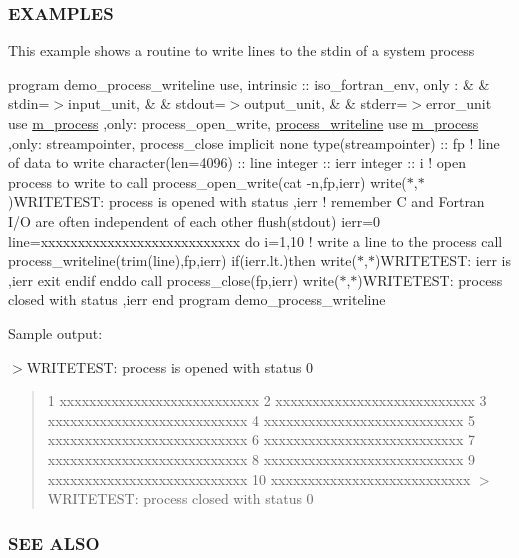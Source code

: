 \subsubsection*{E\+X\+A\+M\+P\+L\+ES}

This example shows a routine to write lines to the stdin of a system process

program demo\+\_\+process\+\_\+writeline use, intrinsic \+:\+: iso\+\_\+fortran\+\_\+env, only \+: \& \& stdin=$>$input\+\_\+unit, \& \& stdout=$>$output\+\_\+unit, \& \& stderr=$>$error\+\_\+unit use \mbox{\hyperlink{namespacem__process}{m\+\_\+process}} ,only\+: process\+\_\+open\+\_\+write, \mbox{\hyperlink{interfacem__process_1_1process__writeline}{process\+\_\+writeline}} use \mbox{\hyperlink{namespacem__process}{m\+\_\+process}} ,only\+: streampointer, process\+\_\+close implicit none type(streampointer) \+:\+: fp ! line of data to write character(len=4096) \+:\+: line integer \+:\+: ierr integer \+:\+: i ! open process to write to call process\+\_\+open\+\_\+write(\textquotesingle{}cat -\/n\textquotesingle{},fp,ierr) write($\ast$,$\ast$)\textquotesingle{}W\+R\+I\+T\+E\+T\+E\+ST\+: process is opened with status \textquotesingle{},ierr ! remember C and Fortran I/O are often independent of each other flush(stdout) ierr=0 line=\textquotesingle{}xxxxxxxxxxxxxxxxxxxxxxxxxxx\textquotesingle{} do i=1,10 ! write a line to the process call process\+\_\+writeline(trim(line),fp,ierr) if(ierr.\+lt.)then write($\ast$,$\ast$)\textquotesingle{}W\+R\+I\+T\+E\+T\+E\+ST\+: ierr is \textquotesingle{},ierr exit endif enddo call process\+\_\+close(fp,ierr) write($\ast$,$\ast$)\textquotesingle{}W\+R\+I\+T\+E\+T\+E\+ST\+: process closed with status \textquotesingle{},ierr end program demo\+\_\+process\+\_\+writeline

Sample output\+:

$>$W\+R\+I\+T\+E\+T\+E\+ST\+: process is opened with status 0 \begin{quote}
1 xxxxxxxxxxxxxxxxxxxxxxxxxxx 2 xxxxxxxxxxxxxxxxxxxxxxxxxxx 3 xxxxxxxxxxxxxxxxxxxxxxxxxxx 4 xxxxxxxxxxxxxxxxxxxxxxxxxxx 5 xxxxxxxxxxxxxxxxxxxxxxxxxxx 6 xxxxxxxxxxxxxxxxxxxxxxxxxxx 7 xxxxxxxxxxxxxxxxxxxxxxxxxxx 8 xxxxxxxxxxxxxxxxxxxxxxxxxxx 9 xxxxxxxxxxxxxxxxxxxxxxxxxxx 10 xxxxxxxxxxxxxxxxxxxxxxxxxxx $>$W\+R\+I\+T\+E\+T\+E\+ST\+: process closed with status 0 \end{quote}


\subsubsection*{S\+EE A\+L\+SO}

